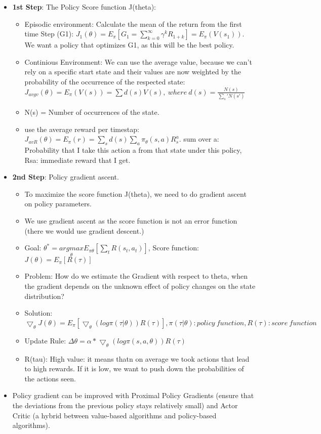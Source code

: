 \begin{itemize}
\begin{itemize}[noitemsep,nolistsep]
		\item \textbf{1st Step}: The Policy Score function J(theta):
		\begin{itemize}[noitemsep,nolistsep]
			\item Episodic environment: Calculate the mean of the return from the first time Step (G1): $J_1(\theta) = E_\pi[G_1 = \sum_{k=0}^\infty \gamma^k R_{1 + k}] = E_\pi (V(s_1))$. We want a policy that optimizes G1, as this will be the best policy.
			\item Continious Environment: We can use the average value, because we can't rely on a specific start state and their values are now weighted by the probability of the occurrence of the respected state: $J_{avgv}(\theta) = E_\pi(V(s)) = \sum d(s)V(s),\ where\ d(s) = \frac{N(s)}{\sum_s'N(s')}$
			\item N(s) = Number of occurrences of the state.
			\item use the average reward per timestap: $J_{avR}(\theta) = E_\pi(r) = \sum_s d(s) \sum_a \pi_\theta(s,a) R_s^a$. sum over a: Probability that I take this action a from that state under this policy, Rsa: immediate reward that I get.
		\end{itemize}
		\item \textbf{2nd Step}: Policy gradient ascent.
		\begin{itemize}[noitemsep,nolistsep]
			\item To maximize the score function J(theta), we need to do gradient ascent on policy parameters.
			\item We use gradient ascent as the score function is not an error function (there we would use gradient descent.)
			\item Goal: $\theta^* = \underset{\theta}{argmax}E_{\pi \theta}[\sum_t R(s_t,a_t)]$, Score function: $J(\theta) = E_\pi[R(\tau)]$
			\item Problem: How do we estimate the Gradient with respect to theta, when the gradient depends on the unknown effect of policy changes on the state distribution?
			\item Solution: $\bigtriangledown_\theta J(\theta) = E_\pi [\bigtriangledown_\theta(log \pi (\tau|\theta))R(\tau)], \pi (\tau|\theta): policy\ function, R(\tau): score\ function$
			\item Update Rule: $\Delta \theta = \alpha * \bigtriangledown_\theta(log \pi (s, a, \theta))R(\tau)$
			\item R(tau): High value: it means thatn on average we took actions that lead to high rewards. If it is low, we want to push down the probabilities of the actions seen.
		\end{itemize}
		\item Policy gradient can be improved with Proximal Policy Gradients (ensure that the deviations from the previous policy stays relatively small) and Actor Critic (a hybrid between value-based algorithms and policy-based algorithms).
	\end{itemize}
\end{itemize} 
